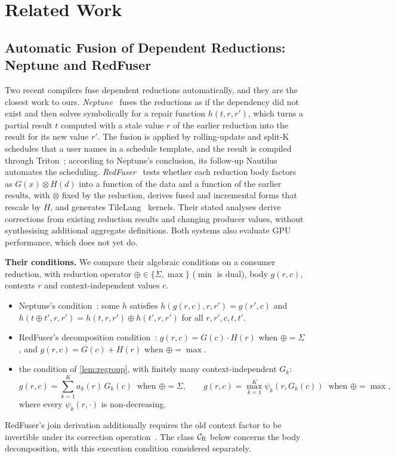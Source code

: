 \section{Related Work}
\label{sec:related}

\subsection{Automatic Fusion of Dependent Reductions: Neptune and RedFuser}
\label{sec:related-prior}

Two recent compilers fuse dependent reductions automatically, and they are the closest work to ours.
\emph{Neptune}~\citep{neptune} fuses the reductions as if the dependency did not exist and then solves symbolically for a repair function $h(t,r,r')$, which turns a partial result $t$ computed with a stale value $r$ of the earlier reduction into the result for its new value $r'$.
The fusion is applied by rolling-update and split-K schedules that a user names in a schedule template, and the result is compiled through Triton~\citep{triton}; according to Neptune's conclusion, its follow-up Nautilus~\citep{nautilus} automates the scheduling.
\emph{RedFuser}~\citep{redfuser} tests whether each reduction body factors as $G(x)\otimes H(d)$ into a function of the data and a function of the earlier results, with $\otimes$ fixed by the reduction, derives fused and incremental forms that rescale by $H$, and generates TileLang~\citep{tilelang} kernels.
Their stated analyses derive corrections from existing reduction results and changing producer values, without synthesising additional aggregate definitions.
Both systems also evaluate GPU performance, which \sys does not yet do.

\textbf{Their conditions.}
We compare their algebraic conditions on a consumer reduction, with reduction operator $\oplus\in\{\Sigma,\max\}$ ($\min$ is dual), body $g(r,c)$, contexts $r$ and context-independent values $c$.
\begin{itemize}
\item[$\Cls{N}$:] Neptune's condition~\citep[Eq.~3--4]{neptune}: some $h$ satisfies $h(g(r,c),r,r')=g(r',c)$ and $h(t\oplus t',r,r')=h(t,r,r')\oplus h(t',r,r')$ for all $r,r',c,t,t'$.
\item[$\Cls{R}$:] RedFuser's decomposition condition~\citep[Eq.~4, Tab.~1]{redfuser}: $g(r,c)=G(c)\cdot H(r)$ when $\oplus=\Sigma$, and $g(r,c)=G(c)+H(r)$ when $\oplus=\max$.
\item[$\Cls{H}$:] the condition of \cref{lem:regroup}, with finitely many context-independent $G_k$:
\[
g(r,c)=\sum_{k=1}^{K}a_k(r)\,G_k(c)\ \text{ when }\oplus=\Sigma,\qquad
g(r,c)=\max_{k=1}^{K}\psi_k(r,G_k(c))\ \text{ when }\oplus=\max,
\]
where every $\psi_k(r,\cdot)$ is non-decreasing.
\end{itemize}
RedFuser's join derivation additionally requires the old context factor to be invertible under its correction operation~\citep[\S3.2.2]{redfuser}.
The class $\Cls{R}$ below concerns the body decomposition, with this execution condition considered separately.

